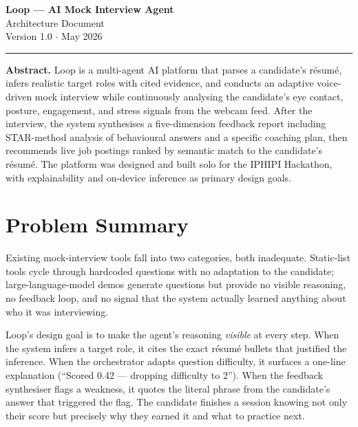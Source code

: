 \documentclass[11pt,a4paper]{article}
\begin{document}
\begin{center}
  {\Large\bfseries Loop --- AI Mock Interview Agent}\\[4pt]
  {\large Architecture Document}\\[2pt]
  {\small Version 1.0 \quad $\cdot$ \quad May 2026}\\[6pt]
  \rule{0.8\textwidth}{0.4pt}
\end{center}

\vspace{6pt}

\noindent
\textbf{Abstract.} Loop is a multi-agent AI platform that parses a candidate's
résumé, infers realistic target roles with cited evidence, and conducts an
adaptive voice-driven mock interview while continuously analysing the
candidate's eye contact, posture, engagement, and stress signals from the
webcam feed. After the interview, the system synthesises a five-dimension
feedback report including STAR-method analysis of behavioural answers and a
specific coaching plan, then recommends live job postings ranked by semantic
match to the candidate's résumé. The platform was designed and built solo for
the IPHIPI Hackathon, with explainability and on-device inference as primary
design goals.

\section{Problem Summary}

Existing mock-interview tools fall into two categories, both inadequate.
Static-list tools cycle through hardcoded questions with no adaptation to the
candidate; large-language-model demos generate questions but provide no
visible reasoning, no feedback loop, and no signal that the system actually
learned anything about who it was interviewing.

Loop's design goal is to make the agent's reasoning \emph{visible} at every
step. When the system infers a target role, it cites the exact résumé bullets
that justified the inference. When the orchestrator adapts question
difficulty, it surfaces a one-line explanation (``Scored 0.42 --- dropping
difficulty to 2''). When the feedback synthesiser flags a weakness, it quotes
the literal phrase from the candidate's answer that triggered the flag. The
candidate finishes a session knowing not only their score but precisely why
they earned it and what to practice next.
\end{document}
